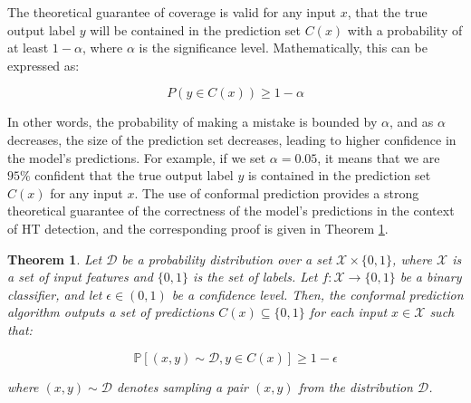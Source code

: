 \documentclass[9pt,conference]{IEEEtran}
\newtheorem{theorem}{Theorem}
\begin{document}
The theoretical guarantee of coverage is valid for any input $x$, that the true output label $y$ will be contained in the prediction set $C(x)$ with a probability of at least $1 - \alpha$, where $\alpha$ is the significance level. Mathematically, this can be expressed as:

$$
P(y \in C(x)) \geq 1 - \alpha
$$

In other words, the probability of making a mistake is bounded by $\alpha$, and as $\alpha$ decreases, the size of the prediction set decreases, leading to higher confidence in the model's predictions. For example, if we set $\alpha = 0.05$, it means that we are $95\%$ confident that the true output label $y$ is contained in the prediction set $C(x)$ for any input $x$. The use of conformal prediction provides a strong theoretical guarantee of the correctness of the model's predictions in the context of HT detection, and the corresponding proof is given in Theorem \ref{thm:coverage}.

\begin{theorem}\label{thm:coverage}
Let $\mathcal{D}$ be a probability distribution over a set $\mathcal{X} \times \{0,1\}$, where $\mathcal{X}$ is a set of input features and $\{0,1\}$ is the set of labels. Let $f: \mathcal{X} \to \{0,1\}$ be a binary classifier, and let $\epsilon \in (0,1)$ be a confidence level. Then, the conformal prediction algorithm outputs a set of predictions $C(x) \subseteq \{0,1\}$ for each input $x \in \mathcal{X}$ such that:

\begin{equation*}
\mathbb{P}[(x,y) \sim \mathcal{D}, y \in C(x)] \geq 1-\epsilon
\end{equation*}

where $(x,y) \sim \mathcal{D}$ denotes sampling a pair $(x,y)$ from the distribution $\mathcal{D}$.

\end{theorem}
\end{document}
